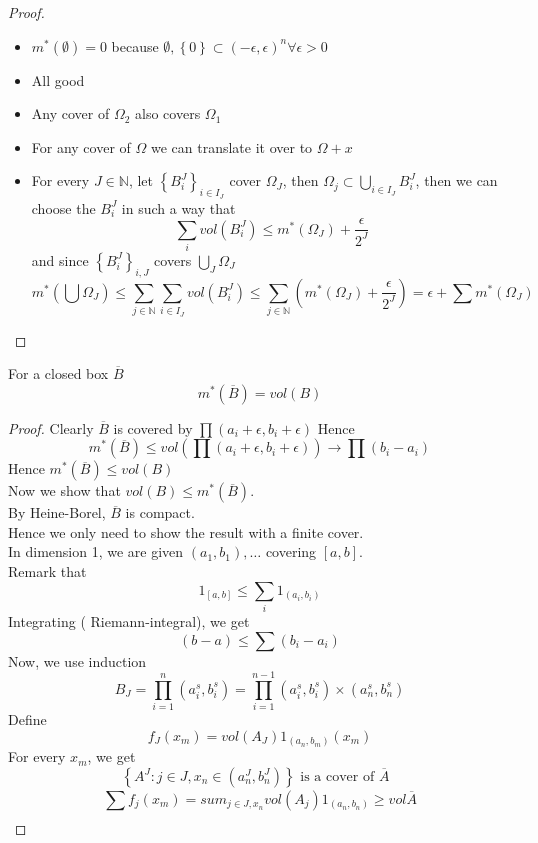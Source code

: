 \documentclass[../main.tex]{subfiles}
\begin{document}
\begin{proof}
	\begin{itemize}
	\item $m^{*}( \emptyset) =0$ because $\emptyset, \left\{ 0 \right\} \subset ( -\epsilon,\epsilon)^{n} \forall \epsilon>0$ 
	\item All good

	\item Any cover of $\Omega_2$ also covers $\Omega_1$ 
	\item For any cover of $\Omega$ we can translate it over to $\Omega+x$ 
	\item For every $J\in \mathbb{N}$, let $\left\{ B_i^{J} \right\}_{i\in I_J}  $ cover $\Omega_J$, then $\Omega_j \subset \bigcup_{i\in I_J} B_i^{J}$, then we can choose the $B_i^{J}$ in such a way that
		\[ 
		\sum_i vol( B_i^{J}) \leq m^{*}( \Omega_J) +\frac{\epsilon}{2^{J}}	
		\]
		and since $ \left\{ B_{i}^{J} \right\} _{i,J} $ covers $\bigcup_J \Omega_J$ 
		\[ 
		m^{*}( \bigcup \Omega_J) \leq \sum_{j\in \mathbb{N}} \sum_{i\in I_J}^{ }vol( B_i^{J}) \leq \sum_{j\in \mathbb{N}}^{ }( m^{*}( \Omega_J) +\frac{\epsilon}{2^{J}}	) = \epsilon+\sum m^{*}( \Omega_J) 	
		\]
		
	\end{itemize}

	
\end{proof}

\begin{propo}
	For a closed box $\overline{B}$ 	
\[ 
m^{*}( \overline{B}) =vol( B) 
\]

\end{propo}
\begin{proof}
Clearly $\overline{B}$ is covered by $\prod ( a_i+\epsilon,b_i+\epsilon) $ 
Hence
\[ 
m^{*}( \overline{B}) \leq vol( \prod( a_i+\epsilon,b_i+\epsilon) ) \to \prod ( b_i-a_i) 
\]
Hence $m^{*}( \overline{B}) \leq vol( B) $ \\
Now we show that $ vol( B) \leq m^{*}( \overline{B}) $.\\
By Heine-Borel, $\overline{B}$ is compact.\\
Hence we only need to show the result with a finite cover.\\
In dimension 1, we are given $( a_1,b_1) ,\ldots$ covering $[a,b]$.\\
Remark that
\[ 
	1_{[a,b]} \leq \sum_i 1_{( a_i,b_i) } 
\]
Integrating ( Riemann-integral), we get
\[ 
	( b-a) \leq \sum ( b_i-a_i) 
\]
Now, we use induction
\[ 
B_J=\prod_{i=1}^{n} ( a_i^{s},b_i^{s}) = \prod_{i=1}^{n-1}( a_i^{s},b_i^{s}) \times ( a_n^{s},b_n^{s}) 
\]
Define
\[ 
f_J( x_m) = vol( A_J) 1_{( a_n,b_m) } ( x_m) 
\]
For every $x_m$, we get
\[ 
	\left\{ A^{J}:j\in J, x_n\in ( a_n^{J},b_n^{J})  \right\} \text{ is a cover of $\overline{A}$  } 
\]
\[ 
	\sum_{}^{ }f_j( x_m) = sum_{j\in J,x_n} vol( A_j) 1_{( a_n,b_n) } \geq vol \overline{A}
\]

\end{proof}




	
\end{document}
